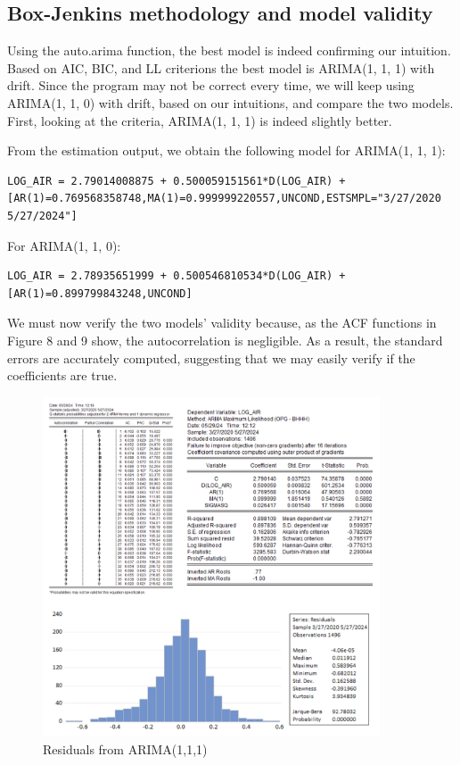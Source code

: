 \documentclass{article} %
\begin{document}
\subsection{Box-Jenkins methodology and model validity}
Using the auto.arima function, the best model is indeed confirming our intuition. Based on AIC, BIC, and LL criterions the best model is ARIMA(1, 1, 1) with drift. Since the program may not be correct every time, we will keep using ARIMA(1, 1, 0) with drift, based on our intuitions, and compare the two models. First, looking at the criteria, ARIMA(1, 1, 1) is indeed slightly better. 

From the estimation output, we obtain the following model for ARIMA(1, 1, 1):

\begin{verbatim}
LOG_AIR = 2.79014008875 + 0.500059151561*D(LOG_AIR) + 
[AR(1)=0.769568358748,MA(1)=0.999999220557,UNCOND,ESTSMPL="3/27/2020 5/27/2024"]
\end{verbatim}

For ARIMA(1, 1, 0):

\begin{verbatim}
LOG_AIR = 2.78935651999 + 0.500546810534*D(LOG_AIR) + [AR(1)=0.899799843248,UNCOND]
\end{verbatim}

We must now verify the two models' validity because, as the ACF functions in Figure 8 and 9 show, the autocorrelation is negligible. As a result, the standard errors are accurately computed, suggesting that we may easily verify if the coefficients are true.

\begin{figure}[H]
    \centering
    \includegraphics[width=10cm]{images/image17.png}
    \caption{Residuals from ARIMA(1,1,1)}
\end{figure}
\end{document}
